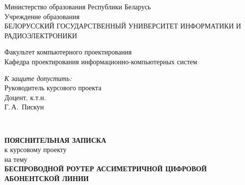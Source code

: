 \documentclass[a4paper,emptystyle]{bsuir-std}
\begin{document}
\begin{titlepage}
\begin{center}
Министерство образования Республики Беларусь\\[1.2em]
Учреждение образования\\[0.4em]
БЕЛОРУССКИЙ ГОСУДАРСТВЕННЫЙ УНИВЕРСИТЕТ ИНФОРМАТИКИ И РАДИОЭЛЕКТРОНИКИ\\[2.0em]
\end{center}
Факультет компьютерного проектирования\\
Кафедра проектирования информационно-компьютерных систем

\begin{flushright}
  \begin{minipage}{0.5\textwidth}
    \textit{К защите допустить:}\\
    Руководитель курсового проекта\\
    Доцент, к.т.н.\\
    \underline{\hspace*{2.8cm}} Г.\,А.~Пискун
  \end{minipage}\\[2em]
\end{flushright}

\begin{center}
  \textbf{ПОЯСНИТЕЛЬНАЯ ЗАПИСКА}\\
  к курсовому проекту\\
  на тему\\[2.0em]

  \textbf{БЕСПРОВОДНОЙ РОУТЕР АССИМЕТРИЧНОЙ ЦИФРОВОЙ АБОНЕНТСКОЙ ЛИНИИ}\\
\end{center}
\end{titlepage}

\lipsum[1]
\end{document}
